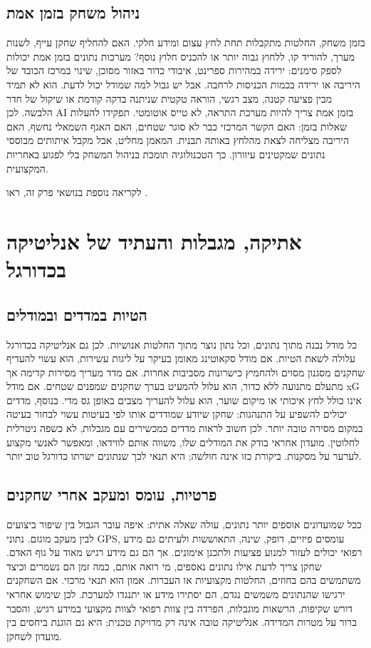 \documentclass[11pt]{report}
\begin{document}
\section{ניהול משחק בזמן אמת}
בזמן משחק, החלטות מתקבלות תחת לחץ עצום ומידע חלקי. האם להחליף שחקן עייף, לשנות מערך, להוריד קו, ללחוץ גבוה יותר או להכניס חלוץ נוסף? מערכות נתונים בזמן אמת יכולות לספק סימנים: ירידה במהירות ספרינט, איבודי כדור באזור מסוכן, שינוי במרכז הכובד של היריבה או ירידה בכמות הכניסות לרחבה. אבל יש גבול למה שמודל יכול לדעת. הוא לא תמיד מבין פציעה קטנה, מצב רגשי, הוראה טקטית שניתנה בדקה קודמת או שיקול של חדר הלבשה. לכן AI בזמן אמת צריך להיות מערכת התראה, לא טייס אוטומטי. תפקידו להעלות שאלות בזמן: האם הקשר המרכזי כבר לא סוגר שטחים, האם האגף השמאלי נחשף, האם היריבה מצליחה לצאת מהלחץ באותה תבנית. המאמן מחליט, אבל מקבל איתותים מבוססי נתונים שמקטינים עיוורון. כך הטכנולוגיה תומכת בניהול המשחק בלי לפגוע באחריות המקצועית.

לקריאה נוספת בנושאי פרק זה, ראו \cite{langchain_docs}.

\chapter{אתיקה, מגבלות והעתיד של אנליטיקה בכדורגל}
\section{הטיות במדדים ובמודלים}
כל מודל נבנה מתוך נתונים, וכל נתון נוצר מתוך החלטות אנושיות. לכן גם אנליטיקה בכדורגל עלולה לשאת הטיות. אם מודל סקאוטינג מאומן בעיקר על ליגות עשירות, הוא עשוי להעדיף שחקנים מסגנון מסוים ולהחמיץ כישרונות מסביבות אחרות. אם מדד מעריך מסירות קדימה אך מתעלם מתנועה ללא כדור, הוא עלול להמעיט בערך שחקנים שמפנים שטחים. אם מודל xG אינו כולל לחץ איכותי או מיקום שוער, הוא עלול להעריך מצבים באופן גס מדי. בנוסף, מדדים יכולים להשפיע על התנהגות: שחקן שיודע שמודדים אותו לפי בעיטות עשוי לבחור בעיטה במקום מסירה טובה יותר. לכן חשוב לראות מדדים כמכשירים עם מגבלות, לא כשפה ניטרלית לחלוטין. מועדון אחראי בודק את המודלים שלו, משווה אותם לווידאו, ומאפשר לאנשי מקצוע לערער על מסקנות. ביקורת כזו אינה חולשה; היא תנאי לכך שנתונים ישרתו כדורגל טוב יותר.

\section{פרטיות, עומס ומעקב אחרי שחקנים}
ככל שמועדונים אוספים יותר נתונים, עולה שאלה אתית: איפה עובר הגבול בין שיפור ביצועים לבין מעקב מוגזם. נתוני GPS, עומסים פיזיים, דופק, שינה, התאוששות ולעיתים גם מידע רפואי יכולים לעזור למנוע פציעות ולתכנן אימונים. אך הם גם מידע רגיש מאוד על גוף האדם. שחקן צריך לדעת אילו נתונים נאספים, מי רואה אותם, כמה זמן הם נשמרים וכיצד משתמשים בהם בחוזים, החלטות מקצועיות או העברות. אמון הוא תנאי מרכזי. אם השחקנים ירגישו שהנתונים משמשים נגדם, הם יסתירו מידע או יתנגדו למערכת. לכן שימוש אחראי דורש שקיפות, הרשאות מוגבלות, הפרדה בין צוות רפואי לצוות מקצועי במידע רגיש, והסבר ברור על מטרות המדידה. אנליטיקה טובה אינה רק מדויקת טכנית; היא גם הוגנת ביחסים בין מועדון לשחקן.
\end{document}
